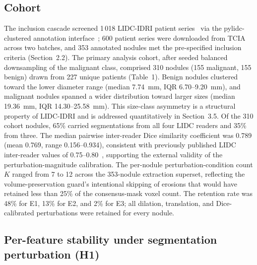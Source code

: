 
\subsection{Cohort}

The inclusion cascade screened 1\,018 LIDC-IDRI patient series~\cite{armato2011} via the pylidc-clustered annotation interface~\cite{hancock2016pylidc}; 600 patient series were downloaded from TCIA~\cite{clark2013} across two batches, and 353 annotated nodules met the pre-specified inclusion criteria (Section~2.2). The primary analysis cohort, after seeded balanced downsampling of the malignant class, comprised 310 nodules (155 malignant, 155 benign) drawn from 227 unique patients (Table~1). Benign nodules clustered toward the lower diameter range (median 7.74~mm, IQR 6.70--9.20~mm), and malignant nodules spanned a wider distribution toward larger sizes (median 19.36~mm, IQR 14.30--25.58~mm). This size-class asymmetry is a structural property of LIDC-IDRI and is addressed quantitatively in Section~3.5. Of the 310 cohort nodules, 65\% carried segmentations from all four LIDC readers and 35\% from three. The median pairwise inter-reader Dice similarity coefficient was 0.789 (mean 0.769, range 0.156--0.934), consistent with previously published LIDC inter-reader values of 0.75--0.80~\cite{kalpathycramer2016}, supporting the external validity of the perturbation-magnitude calibration. The per-nodule perturbation-condition count $K$ ranged from 7 to 12 across the 353-nodule extraction superset, reflecting the volume-preservation guard's intentional skipping of erosions that would have retained less than 25\% of the consensus-mask voxel count. The retention rate was 48\% for E1, 13\% for E2, and 2\% for E3; all dilation, translation, and Dice-calibrated perturbations were retained for every nodule.

\subsection{Per-feature stability under segmentation perturbation (H1)}

